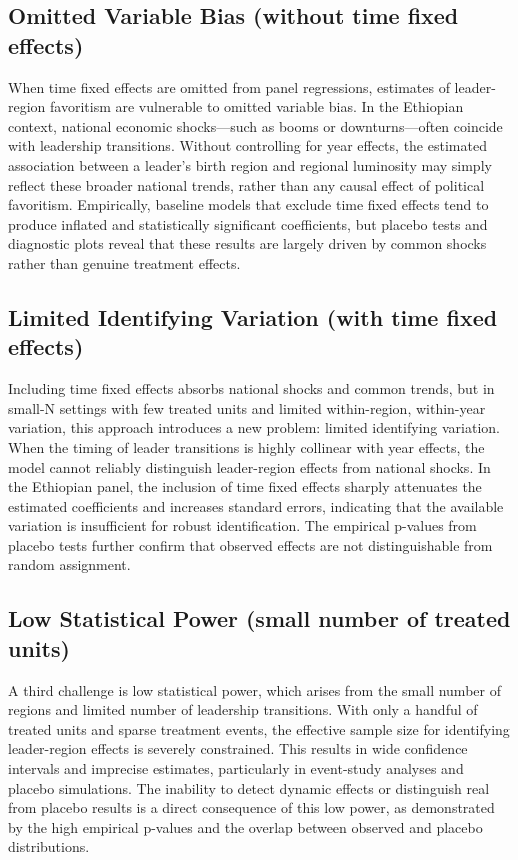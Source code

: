 \documentclass[12pt,a4paper]{article}
\begin{document}
\subsection{Omitted Variable Bias (without time fixed effects)}

When time fixed effects are omitted from panel regressions, estimates of leader-region favoritism are vulnerable to omitted variable bias. In the Ethiopian context, national economic shocks—such as booms or downturns—often coincide with leadership transitions. Without controlling for year effects, the estimated association between a leader’s birth region and regional luminosity may simply reflect these broader national trends, rather than any causal effect of political favoritism. Empirically, baseline models that exclude time fixed effects tend to produce inflated and statistically significant coefficients, but placebo tests and diagnostic plots reveal that these results are largely driven by common shocks rather than genuine treatment effects.

\subsection{Limited Identifying Variation (with time fixed effects)}

Including time fixed effects absorbs national shocks and common trends, but in small-N settings with few treated units and limited within-region, within-year variation, this approach introduces a new problem: limited identifying variation. When the timing of leader transitions is highly collinear with year effects, the model cannot reliably distinguish leader-region effects from national shocks. In the Ethiopian panel, the inclusion of time fixed effects sharply attenuates the estimated coefficients and increases standard errors, indicating that the available variation is insufficient for robust identification. The empirical p-values from placebo tests further confirm that observed effects are not distinguishable from random assignment.

\subsection{Low Statistical Power (small number of treated units)}

A third challenge is low statistical power, which arises from the small number of regions and limited number of leadership transitions. With only a handful of treated units and sparse treatment events, the effective sample size for identifying leader-region effects is severely constrained. This results in wide confidence intervals and imprecise estimates, particularly in event-study analyses and placebo simulations. The inability to detect dynamic effects or distinguish real from placebo results is a direct consequence of this low power, as demonstrated by the high empirical p-values and the overlap between observed and placebo distributions.
\end{document}
